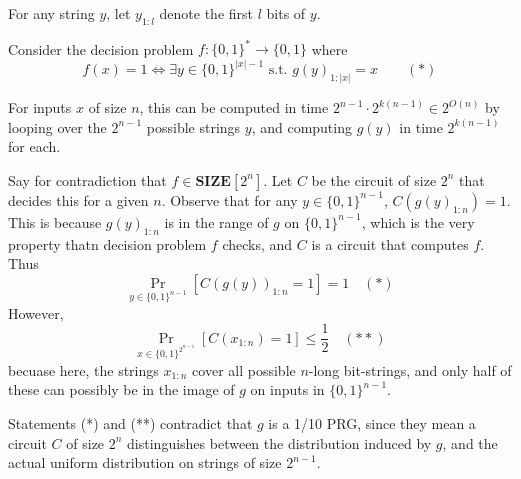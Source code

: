 \documentclass{article}
\newcommand{\SIZE}{\mathbf{SIZE}}
\begin{document}
For any string $y$, let $y_{1:l}$ denote the first $l$ bits of $y$.

Consider the decision problem $f : \{0, 1\}^* \to \{0, 1\}$ where
$$
f(x) = 1 \iff \exists y \in \{0, 1\}^{|x| - 1} \text{ s.t. } g(y)_{1:|x|} = x \qquad (*)
$$

For inputs $x$ of size $n$, this can be computed in time $2^{n-1} \cdot 2^{k(n-1)} \in 2^{O(n)}$ by looping over the $2^{n-1}$ possible strings $y$, and computing $g(y)$ in time $2^{k(n-1)}$ for each.

Say for contradiction that $f \in \SIZE[2^n]$.  Let $C$ be the circuit of size $2^n$ that decides this for a given $n$.
Observe that for any $y \in \{0, 1\}^{n-1}$, $C(g(y)_{1:n}) = 1$.
This is because $g(y)_{1:n}$ is in the range of $g$ on $\{0, 1\}^{n-1}$, which is the very property thatn decision problem $f$ checks, and $C$ is a circuit that computes $f$.
Thus
$$
\Pr_{y \in \{0, 1\}^{n-1}}[C(g(y))_{1:n} = 1] = 1 \quad (*)
$$
However,
$$
\Pr_{x \in \{0, 1\}^{2^{n-1}}}[C(x_{1:n}) = 1] \leq \frac{1}{2} \quad (**)
$$
becuase here, the strings $x_{1:n}$ cover all possible $n$-long bit-strings,
and only half of these can possibly be in the image of $g$ on inputs in $\{0, 1\}^{n-1}$.

Statements (*) and (**) contradict that $g$ is a 1/10 PRG,
since they mean a circuit $C$ of size $2^n$ distinguishes between the distribution
induced by $g$, and the actual uniform distribution on strings of size $2^{n-1}$.




\end{document}
